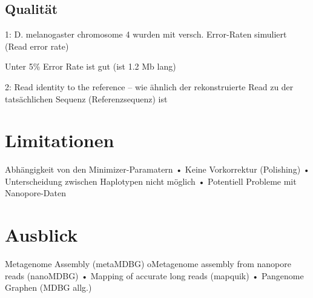 \documentclass[a4paper, 11pt]{article}
\begin{document}
\subsection{Qualität}
1: D. melanogaster chromosome 4  wurden mit versch. Error-Raten simuliert (Read error rate)

Unter 5\% Error Rate ist gut  (ist 1.2 Mb lang)

2: Read identity to the reference – wie ähnlich der rekonstruierte Read zu der tatsächlichen Sequenz (Referenzsequenz) ist  


\section{Limitationen}
Abhängigkeit von den Minimizer-Paramatern
• Keine Vorkorrektur (Polishing)
• Unterscheidung zwischen Haplotypen nicht möglich
• Potentiell Probleme mit Nanopore-Daten

\section{Ausblick}
Metagenome Assembly (metaMDBG)
oMetagenome assembly from nanopore reads (nanoMDBG)
• Mapping of accurate long reads (mapquik)
• Pangenome Graphen (MDBG allg.) \cite{meta} \cite{nano} \cite{mainpaper} \cite{github}


\printbibliography
\end{document}
